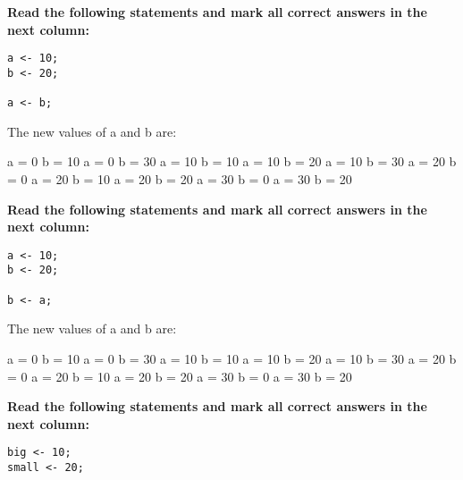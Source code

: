 \documentclass[10pt]{exam}
\begin{document}
\begin{questions}
\vspace{1cm}  \begin{minipage}[t][][t]{0.18\textwidth}
    \question \bf Read the following statements and mark all correct answers in the next column: \raggedright
    \begin{lstlisting}
a <- 10;
b <- 20;

a <- b;    
    \end{lstlisting}
  \end{minipage}
  \hfill
  \begin{minipage}[t][][t]{0.75\textwidth}
    The new values of a and b are:
    \begin{multicols*}{3}
\begin{checkboxes}
      \choice a = 0 b = 10
      \choice a = 0 b = 30
      \choice a = 10 b = 10
      \choice a = 10 b = 20
      \choice a = 10 b = 30
      \choice a = 20 b = 0
      \choice a = 20 b = 10
      \choice a = 20 b = 20
      \choice a = 30 b = 0
      \choice a = 30 b = 20
    \end{checkboxes}
\end{multicols*}
  \end{minipage}

\vspace{1cm}  \begin{minipage}[t][][t]{0.18\textwidth}
    \question \bf Read the following statements and mark all correct answers in the next column: \raggedright
    \begin{lstlisting}
a <- 10;
b <- 20;

b <- a;
  \end{lstlisting}
\end{minipage}
  \hfill
\begin{minipage}[t][][t]{0.75\textwidth}
  The new values of a and b are:
  \begin{multicols*}{3}
\begin{checkboxes}
    \choice a = 0 b = 10
    \choice a = 0 b = 30
    \choice a = 10 b = 10
    \choice a = 10 b = 20
    \choice a = 10 b = 30
    \choice a = 20 b = 0
    \choice a = 20 b = 10
    \choice a = 20 b = 20
    \choice a = 30 b = 0
    \choice a = 30 b = 20
  \end{checkboxes}
\end{multicols*}
\end{minipage}

\vspace{1cm}  \begin{minipage}[t][][t]{0.18\textwidth}
\question \bf Read the following statements and mark all correct answers in the next column: \raggedright
  \begin{lstlisting}
big <- 10;
small <- 20;


\end{lstlisting}
\end{minipage}
\end{questions}
\end{document}
